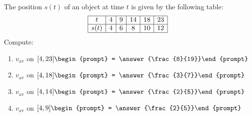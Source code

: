 \documentclass{ximera}
\author{Bart Snapp}
\begin{document}
\begin{exercise}
The position $s(t)$ of an object at time $t$ is given by the following table:
\[
\begin{array}{|c|c|c|c|c|c|}\hline
t &4 &9 &14 &18 &23 \\ \hline
s(t) &4 &6 & 8&10 & 12\\ \hline
\end{array}
\]
Compute:
\begin{enumerate}
\item $v_{\mathrm{av}}$ on $[4,23]\begin{prompt} = \answer{\frac{8}{19}}\end{prompt}$
\item $v_{\mathrm{av}}$ on $[4,18]\begin{prompt} = \answer{\frac{3}{7}}\end{prompt}$
\item $v_{\mathrm{av}}$ on $[4,14]\begin{prompt} = \answer{\frac{2}{5}}\end{prompt}$
\item $v_{\mathrm{av}}$ on $[4,9]\begin{prompt} = \answer{\frac{2}{5}}\end{prompt}$
\end{enumerate}
\end{exercise}
\end{document}
